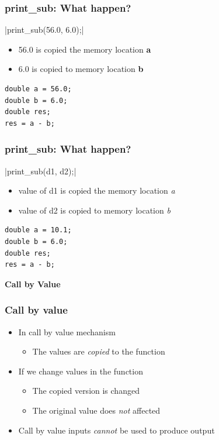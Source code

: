 \documentclass{../c-lecture}
\begin{document}
\begin{frame}[fragile]
  \frametitle{print\_sub: What happen?}
  |print_sub(56.0, 6.0);|
  \begin{itemize}
    \item 56.0 is copied the memory location \textbf{\color{LimeGreen} a}
    \item 6.0 is copied to memory location \textbf{\color{Orange} b}
  \end{itemize}
  \begin{verbatim}
double a = 56.0;
double b = 6.0;
double res;
res = a - b;
  \end{verbatim}
\end{frame}

\begin{frame}[fragile]
  \frametitle{print\_sub: What happen?}
  |print_sub(d1, d2);|
  \begin{itemize}
    \item
      value of d1 is copied the memory location
      \textit{\color{LimeGreen} a}
    \item
      value of d2 is copied to memory location
      \textit{\color{YellowOrange} b}
  \end{itemize}
  \begin{verbatim}
double a = 10.1;
double b = 6.0;
double res;
res = a - b;
  \end{verbatim}
  \textbf{\color{RubineRed} Call by Value}
\end{frame}

\begin{frame}
  \frametitle{Call by value}
  \begin{itemize}
    \item In call by value mechanism
    \begin{itemize}
      \item
        The values are \textit{\color{Orange} copied} to the function
    \end{itemize}
    \item If we change values in the function
    \begin{itemize}
      \item The copied version is changed
      \item
        The original value does \textit{\color{RubineRed} not} affected
    \end{itemize}
    \item
      Call by value inputs \textit{\color{RubineRed} cannot} be used to
      produce output
  \end{itemize}
\end{frame}
\end{document}
